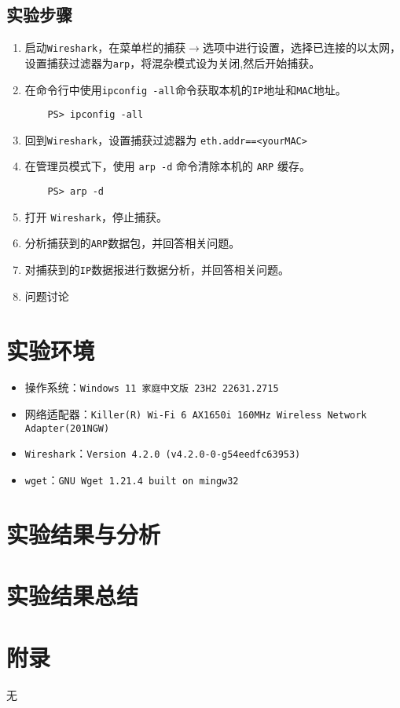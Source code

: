 \documentclass{article}
\begin{document}
\subsection{实验步骤}

\begin{enumerate}[noitemsep, label={{\arabic*})}]
  \item 启动\texttt{Wireshark}，在菜单栏的捕获\(\to \)选项中进行设置，选择已连接的以太网，设置捕获过滤器为\texttt{arp}，将混杂模式设为关闭,然后开始捕获。
  \item 在命令行中使用\texttt{ipconfig -all}命令获取本机的\texttt{IP}地址和\texttt{MAC}地址。
        \begin{lstlisting}
    PS> ipconfig -all
  \end{lstlisting}
  \item 回到\texttt{Wireshark}，设置捕获过滤器为 \texttt{eth.addr==<yourMAC>
  }
  \item 在管理员模式下，使用 \texttt{arp -d} 命令清除本机的 \texttt{ARP} 缓存。
        \begin{lstlisting}
    PS> arp -d
  \end{lstlisting}
  \item 打开 \texttt{Wireshark}，停止捕获。
  \item 分析捕获到的\texttt{ARP}数据包，并回答相关问题。
  \item 对捕获到的\texttt{IP}数据报进行数据分析，并回答相关问题。
  \item 问题讨论
\end{enumerate}

\section{实验环境}


\begin{itemize}[noitemsep]
  \item 操作系统：\texttt{Windows 11 家庭中文版 23H2 22631.2715}
  \item 网络适配器：\texttt{Killer(R) Wi-Fi 6 AX1650i 160MHz Wireless Network Adapter(201NGW)}
  \item \texttt{Wireshark}：\texttt{Version 4.2.0 (v4.2.0-0-g54eedfc63953)}
  \item \texttt{wget}：\texttt{GNU Wget 1.21.4 built on mingw32}
\end{itemize}


\section{实验结果与分析}


\section{实验结果总结}


\section{附录}

无
\end{document}
